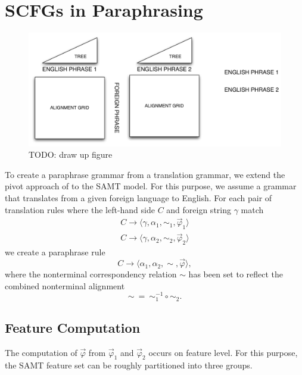 \documentclass[11pt]{article}
\begin{document}
\section{SCFGs in Paraphrasing} \label{acquisition}

\begin{figure}[!t]
\begin{center}
\includegraphics[width=0.8\linewidth]{figures/pivot.pdf}
\end{center}
\caption{TODO: draw up figure}
\end{figure}

To create a paraphrase grammar from a translation grammar, we extend
the pivot approach of  to the SAMT
model. For this purpose, we assume a grammar that translates from a
given foreign language to English. For each pair of translation rules where
the left-hand side $C$ and foreign string $\gamma$ match
\begin{eqnarray*}
C \rightarrow \langle \gamma, \alpha_1, \sim_1, \vec{\varphi}_1 \rangle \\
C \rightarrow \langle \gamma, \alpha_2, \sim_2, \vec{\varphi}_2 \rangle
\end{eqnarray*}
we create a paraphrase rule
\begin{equation*}
C \rightarrow \langle \alpha_1, \alpha_2, \sim, \vec{\varphi} \rangle ,
\end{equation*}
where the nonterminal correspondency relation $\sim$ has been set to
reflect the combined nonterminal alignment
\begin{equation*}
\sim ~ = ~ \sim_1^{-1} \circ \sim_2 .
\end{equation*}

\subsection{Feature Computation}

The computation of $\vec{\varphi}$ from $\vec{\varphi}_1$ and
$\vec{\varphi}_2$ occurs on feature level. For this purpose, the SAMT
feature set can be roughly partitioned into three groups.
\end{document}
